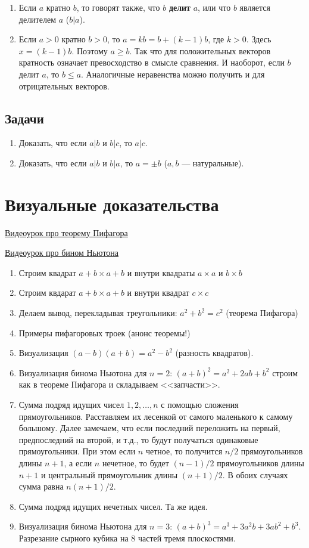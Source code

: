 \begin{enumerate}
\item Если $a$ кратно $b$, то говорят также, что $b$ \textbf{делит} $a$, или что $b$ является делителем $a$ ($b|a$).
\item Если $a>0$ кратно $b>0$, то $a=kb=b+(k-1)b$, где $k>0$. Здесь $x=(k-1)b$. Поэтому $a\ge b$. Так что для положительных векторов кратность означает превосходство в смысле сравнения. И наоборот, если $b$ делит $a$, то $b\le a$. Аналогичные неравенства можно получить и для отрицательных векторов.
\end{enumerate}
\subsection*{Задачи}
\begin{enumerate}
\item Доказать, что если $a|b$ и $b|c$, то $a|c$.
\item Доказать, что если $a|b$ и $b|a$, то $a=\pm b$ ($a,b$ --- натуральные).
\end{enumerate}


\section{Визуальные доказательства}

\href{https://www.youtube.com/watch?v=Xdc8WWFURA8}{Видеоурок про теорему Пифагора}

\href{https://www.youtube.com/watch?v=YXYQmxLDtMw}{Видеоурок про бином Ньютона}

\begin{enumerate}
\item Строим квадрат $a+b\times a+b$ и внутри квадраты $a\times a$ и $b\times b$
\item Строим квдарат $a+b\times a+b$ и внутри квадрат $c\times c$
\item Делаем вывод, перекладывая треугольники: $a^2+b^2=c^2$ (теорема Пифагора)
\item Примеры пифагоровых троек (анонс теоремы!)
\item Визуализация $(a-b)(a+b)=a^2-b^2$ (разность квадратов).
\item Визуализация бинома Ньютона для $n=2$: $(a+b)^2=a^2+2ab+b^2$ строим как в теореме Пифагора и складываем <<запчасти>>.
\item Сумма подряд идущих чисел $1,2,\dots,n$ с помощью сложения прямоугольников. Расставляем их лесенкой от самого маленького к самому большому. Далее замечаем, что если последний переложить на первый, предпоследний на второй, и т.д., то будут получаться одинаковые прямоугольники. При этом если $n$ четное, то получится $n/2$ прямоугольников длины $n+1$, а если $n$ нечетное, то будет $(n-1)/2$ прямоугольников длины $n+1$ и центральный прямоугольник длины $(n+1)/2$. В обоих случаях сумма равна $n(n+1)/2$.
\item Сумма подряд идущих нечетных чисел. Та же идея.
\item Визуализация бинома Ньютона для $n=3$: $(a+b)^3 = a^3+3a^2b+3ab^2+b^3$. Разрезание сырного кубика на 8 частей тремя плоскостями.
\end{enumerate}


